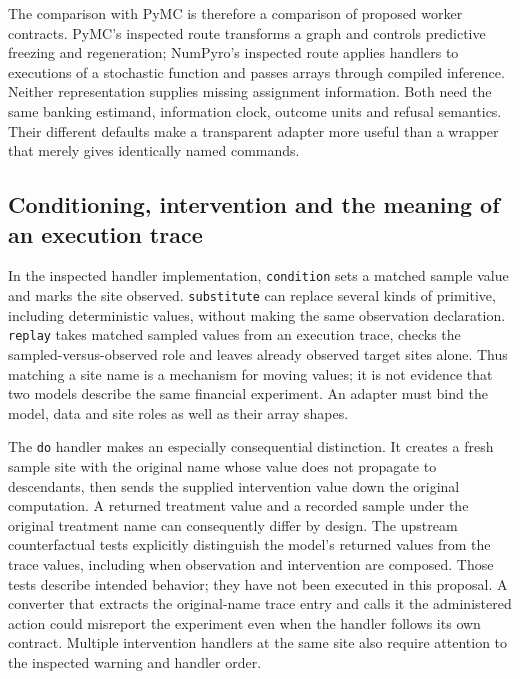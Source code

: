 The comparison with PyMC is therefore a comparison of proposed worker contracts. PyMC's inspected route transforms a graph and controls predictive freezing and regeneration; NumPyro's inspected route applies handlers to executions of a stochastic function and passes arrays through compiled inference. Neither representation supplies missing assignment information. Both need the same banking estimand, information clock, outcome units and refusal semantics. Their different defaults make a transparent adapter more useful than a wrapper that merely gives identically named commands. \cite{exec23_pymc_sources,exec23_numpyro_sources}

\subsection{Conditioning, intervention and the meaning of an execution trace}

In the inspected handler implementation, \texttt{condition} sets a matched sample value and marks the site observed. \texttt{substitute} can replace several kinds of primitive, including deterministic values, without making the same observation declaration. \texttt{replay} takes matched sampled values from an execution trace, checks the sampled-versus-observed role and leaves already observed target sites alone. Thus matching a site name is a mechanism for moving values; it is not evidence that two models describe the same financial experiment. An adapter must bind the model, data and site roles as well as their array shapes. \cite{exec23_numpyro_sources}

The \texttt{do} handler makes an especially consequential distinction. It creates a fresh sample site with the original name whose value does not propagate to descendants, then sends the supplied intervention value down the original computation. A returned treatment value and a recorded sample under the original treatment name can consequently differ by design. The upstream counterfactual tests explicitly distinguish the model's returned values from the trace values, including when observation and intervention are composed. Those tests describe intended behavior; they have not been executed in this proposal. A converter that extracts the original-name trace entry and calls it the administered action could misreport the experiment even when the handler follows its own contract. Multiple intervention handlers at the same site also require attention to the inspected warning and handler order. \cite{exec23_numpyro_sources}


